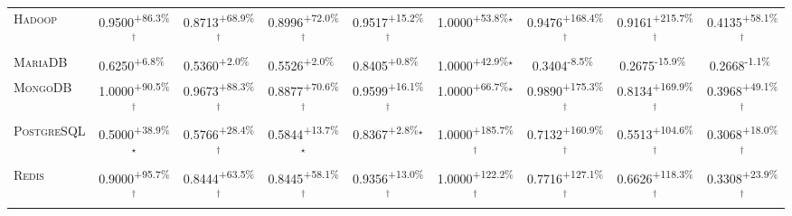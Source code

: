\begin{table}[htbp]
\begin{tabular}{l|cccc|cccc}
\textsc{Hadoop} & \cellcolor{green!30}0.9500\textsuperscript{+86.3\%}$^\dagger$ & \cellcolor{green!30}0.8713\textsuperscript{+68.9\%}$^\dagger$ & \cellcolor{green!30}0.8996\textsuperscript{+72.0\%}$^\dagger$ & \cellcolor{green!30}0.9517\textsuperscript{+15.2\%}$^\dagger$ & \cellcolor{green!30}1.0000\textsuperscript{+53.8\%}$^\star$ & \cellcolor{green!30}0.9476\textsuperscript{+168.4\%}$^\dagger$ & \cellcolor{green!30}0.9161\textsuperscript{+215.7\%}$^\dagger$ & \cellcolor{green!30}0.4135\textsuperscript{+58.1\%}$^\dagger$ \\
\textsc{MariaDB} & \cellcolor{green!30}0.6250\textsuperscript{+6.8\%}$^{\,\,\,}$ & \cellcolor{green!30}0.5360\textsuperscript{+2.0\%}$^{\,\,\,}$ & \cellcolor{green!30}0.5526\textsuperscript{+2.0\%}$^{\,\,\,}$ & \cellcolor{green!30}0.8405\textsuperscript{+0.8\%}$^{\,\,\,}$ & \cellcolor{green!30}1.0000\textsuperscript{+42.9\%}$^\star$ & \cellcolor{red!30}0.3404\textsuperscript{-8.5\%}$^{\,\,\,}$ & \cellcolor{red!30}0.2675\textsuperscript{-15.9\%}$^{\,\,\,}$ & \cellcolor{red!30}0.2668\textsuperscript{-1.1\%}$^{\,\,\,}$ \\
\textsc{MongoDB} & \cellcolor{green!30}1.0000\textsuperscript{+90.5\%}$^\dagger$ & \cellcolor{green!30}0.9673\textsuperscript{+88.3\%}$^\dagger$ & \cellcolor{green!30}0.8877\textsuperscript{+70.6\%}$^\dagger$ & \cellcolor{green!30}0.9599\textsuperscript{+16.1\%}$^\dagger$ & \cellcolor{green!30}1.0000\textsuperscript{+66.7\%}$^\star$ & \cellcolor{green!30}0.9890\textsuperscript{+175.3\%}$^\dagger$ & \cellcolor{green!30}0.8134\textsuperscript{+169.9\%}$^\dagger$ & \cellcolor{green!30}0.3968\textsuperscript{+49.1\%}$^\dagger$ \\
\textsc{PostgreSQL} & \cellcolor{green!30}0.5000\textsuperscript{+38.9\%}$^\star$ & \cellcolor{green!30}0.5766\textsuperscript{+28.4\%}$^\dagger$ & \cellcolor{green!30}0.5844\textsuperscript{+13.7\%}$^\star$ & \cellcolor{green!30}0.8367\textsuperscript{+2.8\%}$^\star$ & \cellcolor{green!30}1.0000\textsuperscript{+185.7\%}$^\dagger$ & \cellcolor{green!30}0.7132\textsuperscript{+160.9\%}$^\dagger$ & \cellcolor{green!30}0.5513\textsuperscript{+104.6\%}$^\dagger$ & \cellcolor{green!30}0.3068\textsuperscript{+18.0\%}$^\dagger$ \\
\textsc{Redis} & \cellcolor{green!30}0.9000\textsuperscript{+95.7\%}$^\dagger$ & \cellcolor{green!30}0.8444\textsuperscript{+63.5\%}$^\dagger$ & \cellcolor{green!30}0.8445\textsuperscript{+58.1\%}$^\dagger$ & \cellcolor{green!30}0.9356\textsuperscript{+13.0\%}$^\dagger$ & \cellcolor{green!30}1.0000\textsuperscript{+122.2\%}$^\dagger$ & \cellcolor{green!30}0.7716\textsuperscript{+127.1\%}$^\dagger$ & \cellcolor{green!30}0.6626\textsuperscript{+118.3\%}$^\dagger$ & \cellcolor{green!30}0.3308\textsuperscript{+23.9\%}$^\dagger$ \\

\end{tabular}
\end{table}
